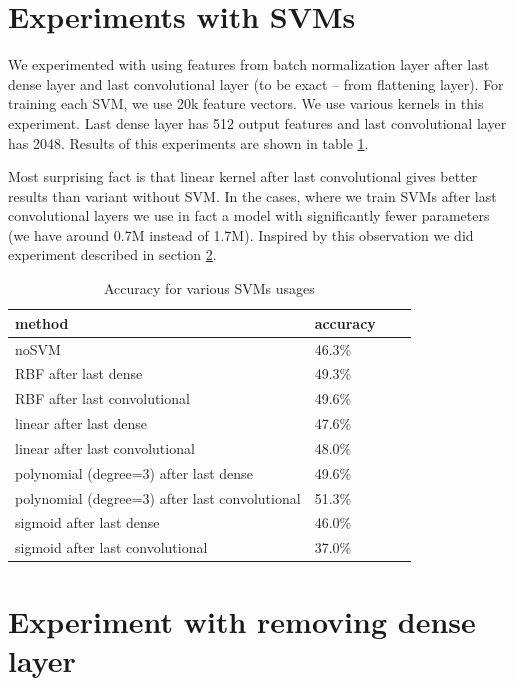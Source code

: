 \documentclass[a4paper]{article}
\begin{document}
\section{Experiments with SVMs}

We experimented with using features from batch normalization layer after last dense layer 
and last convolutional layer (to be exact -- from flattening layer).
For training each SVM, we use 20k feature vectors.
We use various kernels in this experiment.
Last dense layer has 512 output features and last convolutional layer has 2048.
Results of this experiments are shown in table \ref{table:svm}.

Most surprising fact is that linear kernel after last convolutional gives
better results than variant without SVM.
In the cases, where we train SVMs after last convolutional layers we
use in fact a model with significantly fewer parameters (we have around 0.7M instead of 1.7M).
Inspired by this observation we did experiment described in section \ref{last}.

\begin{table}[!hbt]
    \caption{Accuracy for various SVMs usages
    \label{table:svm}
    }
\begin{center}
    \begin{tabular}{| l | l | l | l |}
    \hline
    method&accuracy \\
    \hline
        noSVM & 46.3\% \\
        RBF after last dense & 49.3\% \\
        RBF after last convolutional & 49.6\% \\
        linear after last dense & 47.6\% \\
        linear after last convolutional & 48.0\% \\
        polynomial (degree=3) after last dense & 49.6\% \\
        polynomial (degree=3) after last convolutional & 51.3\% \\
        sigmoid after last dense & 46.0\% \\
        sigmoid after last convolutional & 37.0\% \\
    \hline
    \end{tabular}
\end{center}
\end{table}

\section{Experiment with removing dense layer}
\label{last}
\end{document}
